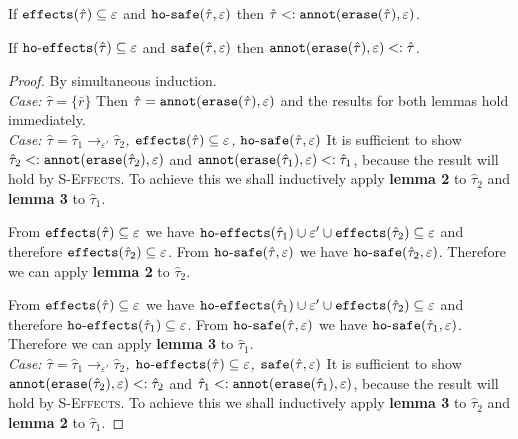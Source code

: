 \begin{appendix}
\hrulefill

\begin{lemma}
If $\mathtt{effects}(\hat \tau) \subseteq \varepsilon$ and $\mathtt{ho \hbox{-} safe}(\hat \tau, \varepsilon)$ then $\hat \tau <: \mathtt{annot}(\mathtt{erase}(\hat \tau), \varepsilon)$.
\end{lemma}

\begin{lemma}
If $\mathtt{ho \hbox{-} effects}(\hat \tau) \subseteq \varepsilon$ and $\mathtt{safe}(\hat \tau, \varepsilon)$ then $\mathtt{annot(erase}(\hat \tau), \varepsilon) <: \hat \tau$.
\end{lemma}

\begin{proof}
By simultaneous induction.\\

\textit{Case:} $\hat \tau = \{ \bar r \}$ Then $\hat \tau = \mathtt{annot(erase}(\hat \tau), \varepsilon)$ and the results for both lemmas hold immediately. \\

\textit{Case: $\hat \tau = \hat \tau_1 \rightarrow_{\varepsilon'} \hat \tau_2$, $\mathtt{effects}(\hat \tau) \subseteq \varepsilon$, $\mathtt{ho \hbox{-} safe}(\hat \tau, \varepsilon)$} It is sufficient to show $\hat \tau_2 <: \mathtt{annot(erase}(\hat \tau_2), \varepsilon)$ and $\mathtt{annot(erase}(\hat \tau_1), \varepsilon) <: \hat \tau_1$, because the result will hold by \textsc{S-Effects}. To achieve this we shall inductively apply \textbf{lemma 2} to $\hat \tau_2$ and \textbf{lemma 3} to $\hat \tau_1$. 

From $\mathtt{effects}(\hat \tau) \subseteq \varepsilon$ we have $\mathtt{ho \hbox{-} effects}(\hat \tau_1) \cup \varepsilon' \cup \mathtt{effects}(\hat \tau_2) \subseteq \varepsilon$ and therefore $\mathtt{effects}(\hat \tau_2) \subseteq \varepsilon$. From $\mathtt{ho \hbox{-} safe}(\hat \tau, \varepsilon)$ we have $\mathtt{ho \hbox{-} safe}(\hat \tau_2, \varepsilon)$. Therefore we can apply \textbf{lemma 2} to $\hat \tau_2$.

From $\mathtt{effects}(\hat \tau) \subseteq \varepsilon$ we have $\mathtt{ho \hbox{-} effects}(\hat \tau_1) \cup \varepsilon' \cup \mathtt{effects}(\hat \tau_2) \subseteq \varepsilon$ and therefore $\mathtt{ho \hbox{-} effects}(\hat \tau_1) \subseteq \varepsilon$. From $\mathtt{ho \hbox{-} safe}(\hat \tau, \varepsilon)$ we have $\mathtt{ho \hbox{-} safe}(\hat \tau_1, \varepsilon)$. Therefore we can apply \textbf{lemma 3} to $\hat \tau_1$.\\

\textit{Case: $\hat \tau = \hat \tau_1 \rightarrow_{\varepsilon'} \hat \tau_2$, $\mathtt{ho \hbox{-} effects}(\hat \tau) \subseteq \varepsilon$, $\mathtt{safe}(\hat \tau, \varepsilon)$ } It is sufficient to show $\mathtt{annot(erase}(\hat \tau_2), \varepsilon) <: \hat \tau_2$ and $\hat \tau_1 <: \mathtt{annot(erase}(\hat \tau_1), \varepsilon)$, because the result will hold by \textsc{S-Effects}. To achieve this we shall inductively apply \textbf{lemma 3} to $\hat \tau_2$ and \textbf{lemma 2} to $\hat \tau_1$.


\end{proof}
\end{appendix}
